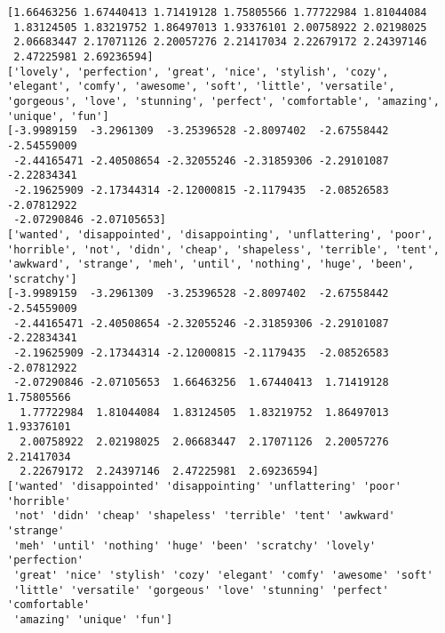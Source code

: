 \documentclass[11pt]{article}
\begin{document}
    \begin{Verbatim}[commandchars=\\\{\}]
[1.66463256 1.67440413 1.71419128 1.75805566 1.77722984 1.81044084
 1.83124505 1.83219752 1.86497013 1.93376101 2.00758922 2.02198025
 2.06683447 2.17071126 2.20057276 2.21417034 2.22679172 2.24397146
 2.47225981 2.69236594]
['lovely', 'perfection', 'great', 'nice', 'stylish', 'cozy', 'elegant', 'comfy', 'awesome', 'soft', 'little', 'versatile', 'gorgeous', 'love', 'stunning', 'perfect', 'comfortable', 'amazing', 'unique', 'fun']
[-3.9989159  -3.2961309  -3.25396528 -2.8097402  -2.67558442 -2.54559009
 -2.44165471 -2.40508654 -2.32055246 -2.31859306 -2.29101087 -2.22834341
 -2.19625909 -2.17344314 -2.12000815 -2.1179435  -2.08526583 -2.07812922
 -2.07290846 -2.07105653]
['wanted', 'disappointed', 'disappointing', 'unflattering', 'poor', 'horrible', 'not', 'didn', 'cheap', 'shapeless', 'terrible', 'tent', 'awkward', 'strange', 'meh', 'until', 'nothing', 'huge', 'been', 'scratchy']
[-3.9989159  -3.2961309  -3.25396528 -2.8097402  -2.67558442 -2.54559009
 -2.44165471 -2.40508654 -2.32055246 -2.31859306 -2.29101087 -2.22834341
 -2.19625909 -2.17344314 -2.12000815 -2.1179435  -2.08526583 -2.07812922
 -2.07290846 -2.07105653  1.66463256  1.67440413  1.71419128  1.75805566
  1.77722984  1.81044084  1.83124505  1.83219752  1.86497013  1.93376101
  2.00758922  2.02198025  2.06683447  2.17071126  2.20057276  2.21417034
  2.22679172  2.24397146  2.47225981  2.69236594]
['wanted' 'disappointed' 'disappointing' 'unflattering' 'poor' 'horrible'
 'not' 'didn' 'cheap' 'shapeless' 'terrible' 'tent' 'awkward' 'strange'
 'meh' 'until' 'nothing' 'huge' 'been' 'scratchy' 'lovely' 'perfection'
 'great' 'nice' 'stylish' 'cozy' 'elegant' 'comfy' 'awesome' 'soft'
 'little' 'versatile' 'gorgeous' 'love' 'stunning' 'perfect' 'comfortable'
 'amazing' 'unique' 'fun']

    \end{Verbatim}

    \begin{center}
    \end{center}
    { \hspace*{\fill} \\}
    
\end{document}
